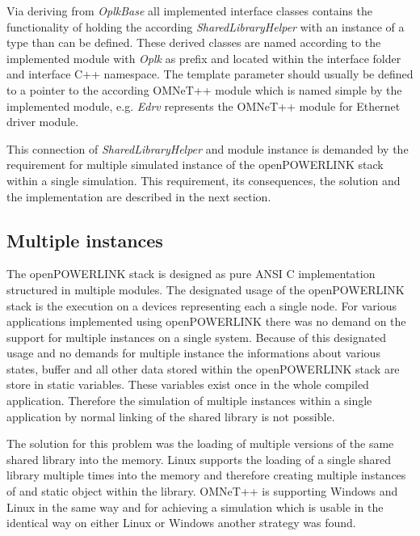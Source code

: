 Via deriving from \emph{OplkBase} all implemented interface classes contains the functionality of holding the according \emph{SharedLibraryHelper} with an instance of a type than can be defined.
These derived classes are named according to the implemented module with \emph{Oplk} as prefix and located within the interface folder and interface C++ namespace.
The template parameter should usually be defined to a pointer to the according OMNeT++ module which is named simple by the implemented module, e.g. \emph{Edrv} represents the OMNeT++ module for Ethernet driver module.

This connection of \emph{SharedLibraryHelper} and module instance is demanded by the requirement for multiple simulated instance of the openPOWERLINK stack within a single simulation.
This requirement, its consequences, the solution and the implementation are described in the next section.

\subsection{Multiple instances}
\label{sec:porting_stack_multiinstance}
The openPOWERLINK stack is designed as pure ANSI C implementation structured in multiple modules.
The designated usage of the openPOWERLINK stack is the execution on a devices representing each a single node.
For various applications implemented using openPOWERLINK there was no demand on the support for multiple instances on a single system.
Because of this designated usage and no demands for multiple instance the informations about various states, buffer and all other data stored within the openPOWERLINK stack are store in static variables.
These variables exist once in the whole compiled application.
Therefore the simulation of multiple instances within a single application by normal linking of the shared library is not possible.

The solution for this problem was the loading of multiple versions of the same shared library into the memory.
Linux supports the loading of a single shared library multiple times into the memory and therefore creating multiple instances of and static object within the library.
OMNeT++ is supporting Windows and Linux in the same way and for achieving a simulation which is usable in the identical way on either Linux or Windows another strategy was found.

